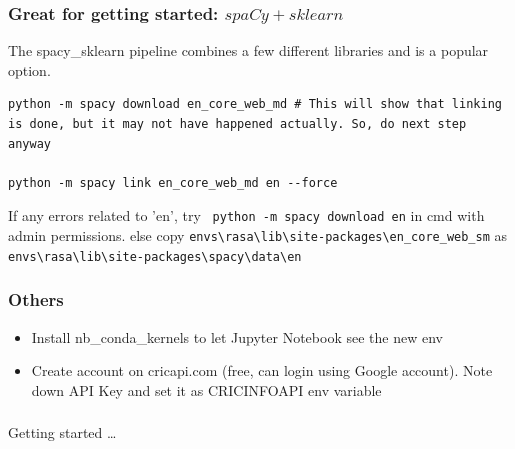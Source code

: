  \begin{frame}[fragile]\frametitle{Great for getting started: $spaCy + sklearn$}
 The spacy\_sklearn pipeline combines a few different libraries and is a popular option.

\begin{lstlisting}
python -m spacy download en_core_web_md # This will show that linking is done, but it may not have happened actually. So, do next step anyway

python -m spacy link en_core_web_md en --force
\end{lstlisting}

If any errors related to 'en', try \lstinline| python -m spacy download en| in cmd with admin permissions.
else copy \lstinline|envs\rasa\lib\site-packages\en_core_web_sm| as \lstinline|envs\rasa\lib\site-packages\spacy\data\en|

\end{frame}

 \begin{frame}[fragile]\frametitle{Others}
\begin{itemize}
\item Install nb\_conda\_kernels to let Jupyter Notebook see the new env
\item Create account on cricapi.com (free, can login using Google account). Note down API Key and set it as CRICINFOAPI env variable
\end{itemize}

\end{frame}


\begin{frame}[fragile]\frametitle{}
\begin{center}
{\Large Getting started \ldots}


\end{center}
\end{frame}



